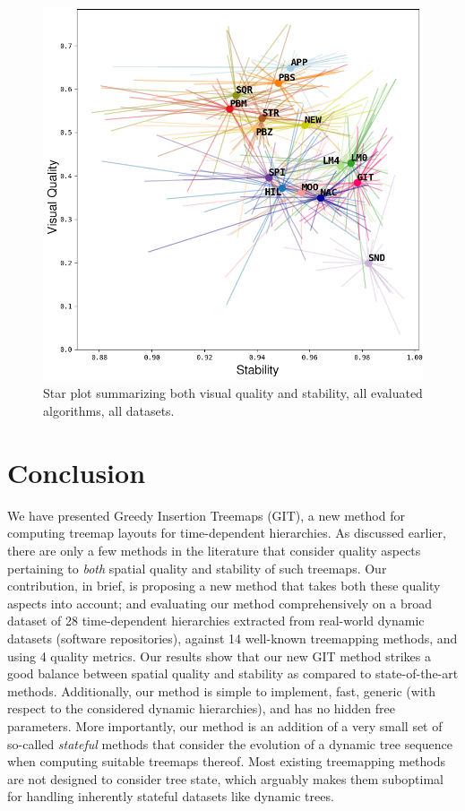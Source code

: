 \begin{figure}[htbp!]
\centering
  \includegraphics[width=0.8\linewidth]{figures/treemap-algorithm/star.png}
\caption{Star plot summarizing both visual quality and stability, all evaluated algorithms, all datasets.}
\label{fig:star-3}
\end{figure}

\section{Conclusion}
\label{sec:conclusion-3}
We have presented Greedy Insertion Treemaps (GIT), a new method for computing treemap layouts for time-dependent hierarchies. As discussed earlier, there are only a few methods in the literature that consider quality aspects pertaining to \emph{both} spatial quality and stability of such treemaps. Our contribution, in brief, is proposing a new method that takes both these quality aspects into account; and evaluating our method comprehensively on a broad dataset of 28 time-dependent hierarchies extracted from real-world dynamic datasets (software repositories), against 14 well-known treemapping methods, and using 4 quality metrics. Our results show that our new GIT method strikes a good balance between spatial quality and stability as compared to state-of-the-art methods. Additionally, our method is simple to implement, fast, generic (with respect to the considered dynamic hierarchies), and has no hidden free parameters. More importantly, our method is an addition of a very small set of so-called \emph{stateful} methods that consider the evolution of a dynamic tree sequence when computing suitable treemaps thereof. Most existing treemapping methods are not designed to consider tree state, which arguably makes them suboptimal for handling inherently stateful datasets like dynamic trees.

